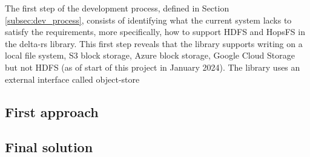 
The first step of the development process, defined in Section \ref{subsec:dev_process}, consists of identifying what the current system lacks to satisfy the requirements, more specifically, how to support \gls{HDFS} and \gls{HopsFS} in the delta-rs \cite{DeltaioDeltars2024} library. This first step reveals that the library supports writing on a local file system, S3 block storage, Azure block storage, Google Cloud Storage but not \gls{HDFS} (as of start of this project in January 2024). The library uses an external interface called object-store  

\subsection{First approach}

\subsection{Final solution}
